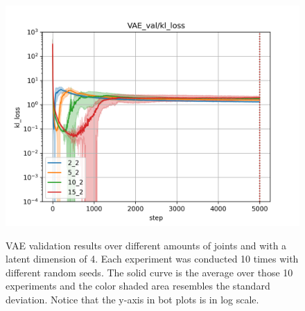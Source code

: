 \begin{figure}[h]
\begin{center}
{        \includegraphics[width=0.31 \linewidth]{figures/experiments/vae_comparison_latent_2_kl_loss.png}
            \label{fig:VAE_latent/kl_2}
            }
        \hfill
        \hfill
    \end{center}
    \caption[VAE validation results, only distance loss and latent = 4]{VAE validation results over different amounts of joints and with a latent dimension of 4. Each experiment was conducted 10 times with different random seeds. The solid curve is the average over those 10 experiments and the color shaded area resembles the standard deviation. Notice that the y-axis in bot plots is in log scale.}
    \label{fig:VAE_latent}
\end{figure}

